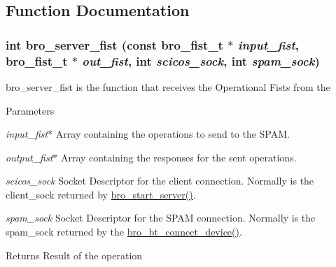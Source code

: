 \subsection{Function Documentation}
\hypertarget{group___bro_comm_ga2f7cfb1ee0291e76edde0288f71dc02c}{
\subsubsection[{bro\_\-server\_\-fist}]{\setlength{\rightskip}{0pt plus 5cm}int bro\_\-server\_\-fist (const {\bf bro\_\-fist\_\-t} $\ast$ {\em input\_\-fist}, \/  {\bf bro\_\-fist\_\-t} $\ast$ {\em out\_\-fist}, \/  int {\em scicos\_\-sock}, \/  int {\em spam\_\-sock})}}
\label{group___bro_comm_ga2f7cfb1ee0291e76edde0288f71dc02c}


bro\_\-server\_\-fist is the function that receives the Operational Fists from the 


\begin{DoxyParams}{Parameters}
\item[{\em input\_\-fist$\ast$}]Array containing the operations to send to the SPAM. \item[{\em output\_\-fist$\ast$}]Array containing the responses for the sent operations. \item[{\em scicos\_\-sock}]Socket Descriptor for the client connection. Normally is the {\ttfamily client\_\-sock} returned by \hyperlink{group___bro_comm_ga7fa314c91710130869c2d4ba31f4ac77}{bro\_\-start\_\-server()}. \item[{\em spam\_\-sock}]Socket Descriptor for the SPAM connection. Normally is the {\ttfamily spam\_\-sock} returned by the \hyperlink{group___bro_b_t_ga3782811f033f57a69b10be399da70207}{bro\_\-bt\_\-connect\_\-device()}. \end{DoxyParams}
\begin{DoxyReturn}{Returns}
Result of the operation 
\end{DoxyReturn}

